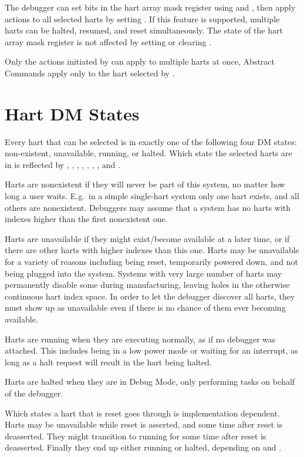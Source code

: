 The debugger can set bits in the hart array mask register using \RdmHawindowsel
and \RdmHawindow, then apply actions to all selected harts by setting \FdmDmcontrolHasel. If
this feature is supported, multiple harts can be halted, resumed, and reset
simultaneously. The state of the hart array mask register is not affected by
setting or clearing \FdmDmcontrolHasel.

Only the actions initiated by \RdmDmcontrol can apply to multiple harts
at once, Abstract Commands apply only to the hart selected by
\Fhartsel.

\section{Hart DM States}

Every hart that can be selected is in exactly one of the following four DM states:
non-existent, unavailable, running, or halted. Which state
the selected harts are in is reflected by \FdmDmstatusAllnonexistent,
\FdmDmstatusAnynonexistent, \FdmDmstatusAllunavail, \FdmDmstatusAnyunavail,
\FdmDmstatusAllrunning, \FdmDmstatusAnyrunning, \FdmDmstatusAllhalted, and
\FdmDmstatusAnyhalted.

Harts are nonexistent if they will never be part of this system, no matter how
long a user waits. E.g.\ in a simple single-hart system only one hart exists,
and all others are nonexistent. Debuggers may assume that a system has no harts
with indexes higher than the first nonexistent one.

Harts are unavailable if they might exist/become available at a later time, or
if there are other harts with higher indexes than this one. Harts may be
unavailable for a variety of reasons including being reset, temporarily powered
down, and not being plugged into the system.
Systems with very large number of harts may
permanently disable some during manufacturing, leaving holes in the otherwise
continuous hart index space. In order to let the debugger discover all harts,
they must show up as unavailable even if there is no chance of them ever
becoming available.

Harts are running when they are executing normally, as if no debugger was
attached. This includes being in a low power mode or waiting for an interrupt,
as long as a halt request will result in the hart being halted.

Harts are halted when they are in Debug Mode, only performing tasks on behalf
of the debugger.

Which states a hart that is reset goes through is implementation dependent.
Harts may be unavailable while reset is asserted, and some time after reset is
deasserted. They might transition to running for some time after reset is
deasserted. Finally they end up either running or halted, depending on
\FdmDmcontrolHaltreq and \Fresethaltreq.

